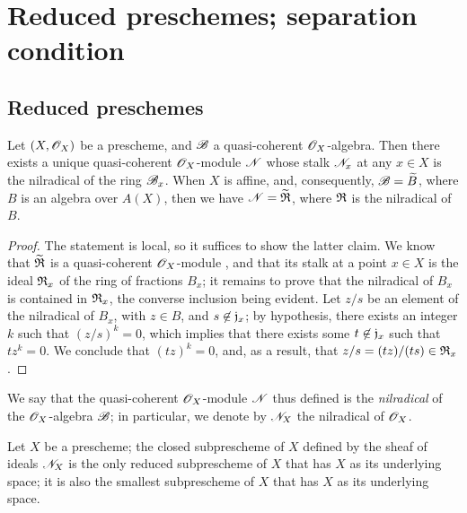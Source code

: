 \section{Reduced preschemes; separation condition}
\label{section:reduced-preschemes-and-separation-condition}

\subsection{Reduced preschemes}
\label{subsection:reduced-preschemes}

\begin{prop}[5.1.1]
\label{1.5.1.1}
Let $(X,\mathscr{O}_X)$ be a prescheme, and $\mathscr{B}$ a quasi-coherent $\mathscr{O}_X$-algebra.
Then there exists a unique quasi-coherent $\mathscr{O}_X$-module $\mathscr{N}$ whose stalk $\mathscr{N}_x$ at any $x\in X$ is the nilradical of the ring $\mathscr{B}_x$.
When $X$ is affine, and, consequently, $\mathscr{B}={\widetilde{B}}$, where $B$ is an algebra over $A(X)$, then we have $\mathscr{N}={\widetilde{\mathfrak{R}}}$, where $\mathfrak{R}$ is the nilradical of $B$.
\end{prop}

\begin{proof}
\label{proof-1.5.1.1}
The statement is local, so it suffices to show the latter claim.
We know that ${\widetilde{\mathfrak{R}}}$ is a quasi-coherent $\mathscr{O}_X$-module , and that its stalk at a point $x\in X$ is the ideal $\mathfrak{R}_x$ of the ring of fractions $B_x$;
it remains to prove that the nilradical of $B_x$ is contained in $\mathfrak{R}_x$, the converse inclusion being evident.
Let $z/s$ be an element of the nilradical of $B_x$, with $z\in B$, and $s\not\in\mathfrak{j}_x$;
by hypothesis, there exists an integer $k$ such that $(z/s)^k=0$, which implies that there exists some $t\not\in\mathfrak{j}_x$ such that $tz^k=0$.
We conclude that $(tz)^k=0$, and, as a result, that $z/s=(tz)/(ts)\in\mathfrak{R}_x$.
\end{proof}

We say that the quasi-coherent $\mathscr{O}_X$-module $\mathscr{N}$ thus defined is the \emph{nilradical} of the $\mathscr{O}_X$-algebra $\mathscr{B}$; in particular, we denote by $\mathscr{N}_X$ the nilradical of $\mathscr{O}_X$.

\begin{cor}[5.1.2]
\label{1.5.1.2}
Let $X$ be a prescheme;
the closed subprescheme of $X$ defined by the sheaf of ideals $\mathscr{N}_X$ is the only reduced subprescheme  of $X$ that has $X$ as its underlying space;
it is also the smallest subprescheme of $X$ that has $X$ as its underlying space.
\end{cor}

